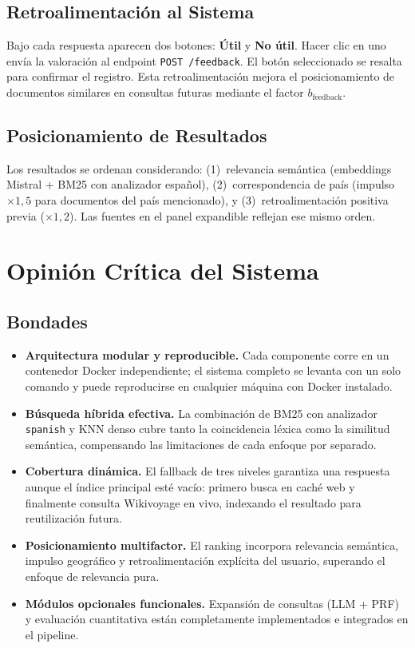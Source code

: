 \documentclass[runningheads]{llncs}
\begin{document}
\subsection{Retroalimentaci\'on al Sistema}

Bajo cada respuesta aparecen dos botones: \textbf{\'Util} y
\textbf{No \'util}. Hacer clic en uno env\'ia la valoraci\'on al endpoint
\texttt{POST /feedback}. El bot\'on seleccionado se resalta para confirmar
el registro. Esta retroalimentaci\'on mejora el posicionamiento de
documentos similares en consultas futuras mediante el factor
$b_{\text{feedback}}$.

\subsection{Posicionamiento de Resultados}

Los resultados se ordenan considerando: (1)~relevancia sem\'antica
(embeddings Mistral + BM25 con analizador espa\~nol), (2)~correspondencia
de pa\'is (impulso $\times 1{,}5$ para documentos del pa\'is mencionado),
y (3)~retroalimentaci\'on positiva previa ($\times 1{,}2$). Las fuentes
en el panel expandible reflejan ese mismo orden.

\section{Opini\'on Cr\'itica del Sistema}
\label{sec:critica}

\subsection{Bondades}

\begin{itemize}
  \item \textbf{Arquitectura modular y reproducible.} Cada componente
  corre en un contenedor Docker independiente; el sistema completo se
  levanta con un solo comando y puede reproducirse en cualquier m\'aquina
  con Docker instalado.
  \item \textbf{B\'usqueda h\'ibrida efectiva.} La combinaci\'on de BM25
  con analizador \texttt{spanish} y KNN denso cubre tanto la coincidencia
  l\'exica como la similitud sem\'antica, compensando las limitaciones de
  cada enfoque por separado.
  \item \textbf{Cobertura din\'amica.} El fallback de tres niveles
  garantiza una respuesta aunque el \'indice principal est\'e vac\'io:
  primero busca en cach\'e web y finalmente consulta Wikivoyage en vivo,
  indexando el resultado para reutilizaci\'on futura.
  \item \textbf{Posicionamiento multifactor.} El ranking incorpora
  relevancia sem\'antica, impulso geogr\'afico y retroalimentaci\'on
  expl\'icita del usuario, superando el enfoque de relevancia pura.
  \item \textbf{M\'odulos opcionales funcionales.} Expansi\'on de
  consultas (LLM + PRF) y evaluaci\'on cuantitativa est\'an completamente
  implementados e integrados en el pipeline.
\end{itemize}
\end{document}

